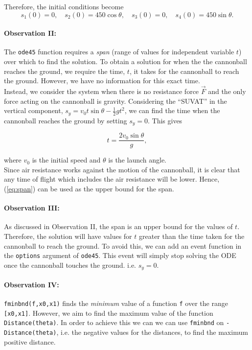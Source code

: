 \documentclass[11pt]{report}
\begin{document}
	Therefore, the initial conditions become 
	\begin{equation}
		s_1(0)=0, \quad s_2(0)=450\cos{\theta}, \quad s_3(0)=0, \quad s_4(0)=450\sin{\theta}.
		\label{eq:icode45}
	\end{equation}

\paragraph{Observation II:}
The \texttt{ode45} function requires a \emph{span} (range of values for independent variable $t$) over which to find the solution. To obtain a solution for when the the cannonball reaches the ground, we require the time, $t$, it takes for the cannonball to reach the ground. However, we have no information for this exact time. \\

Instead, we consider the system when there is no resistance force $\vec{F}$ and the only force acting on the cannonball is gravity. Considering the ``SUVAT'' in the vertical component, $s_y = v_0t\sin{\theta} - \frac{1}{2}gt^2$, we can find the time when the cannonball reaches the ground by setting $s_y=0$. This gives

\begin{equation}
	t=\frac{2v_0\sin{\theta}}{g},
	\label{eq:span}
\end{equation}

where $v_0$ is the initial speed and $\theta$ is the launch angle.\\

Since air resistance works against the motion of the cannonball, it is clear that any time of flight which includes the air resistance will be lower. Hence, (\ref{eq:span}) can be used as the upper bound for the span.

\paragraph{Observation III:}
As discussed in Observation II, the span is an upper bound for the values of $t$. Therefore, the solution will have values for $t$ greater than the time taken for the cannonball to reach the ground. To avoid this, we can add an event function in the \texttt{options} argument of \texttt{ode45}. This event will simply stop solving the ODE once the cannonball touches the ground. i.e. $s_y=0$.

\paragraph{Observation IV:}
\texttt{fminbnd(f,x0,x1)} finds the \emph{minimum} value of a function \texttt{f} over the range \texttt{[x0,x1]}. However, we aim to find the maximum value of the function \texttt{Distance(theta)}. In order to achieve this we can we can use \texttt{fminbnd} on \texttt{-Distance(theta)}, i.e. the negative values for the distances, to find the maximum positive distance.
\end{document}
